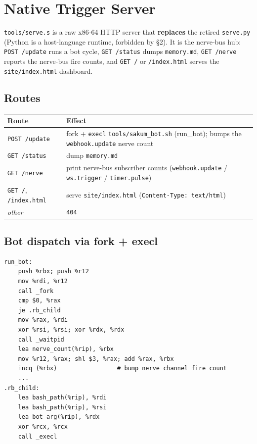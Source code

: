 \section{Native Trigger Server}\label{ch:server}

\texttt{tools/serve.s} is a raw x86-64 HTTP server that \textbf{replaces}
the retired \texttt{serve.py} (Python is a host-language runtime, forbidden
by \S2).  It is the nerve-bus hub: \texttt{POST /update} runs a bot cycle,
\texttt{GET /status} dumps \texttt{memory.md}, \texttt{GET /nerve} reports
the nerve-bus fire counts, and \texttt{GET /} or \texttt{/index.html}
serves the \texttt{site/index.html} dashboard.

\subsection{Routes}

\begin{table}[H]
\centering
\begin{tabularx}{\textwidth}{lX}
\toprule
Route & Effect \\
\midrule
\texttt{POST /update} & fork + \texttt{execl} \texttt{tools/sakum\_bot.sh}
  (run\_bot); bumps the \texttt{webhook.update} nerve count \\
\texttt{GET /status} & dump \texttt{memory.md} \\
\texttt{GET /nerve} & print nerve-bus subscriber counts
  (\texttt{webhook.update} / \texttt{ws.trigger} / \texttt{timer.pulse}) \\
\texttt{GET /}, \texttt{/index.html} & serve \texttt{site/index.html}
  (\texttt{Content-Type: text/html}) \\
\textit{other} & \texttt{404} \\
\bottomrule
\end{tabularx}
\end{table}

\subsection{Bot dispatch via fork + execl}

\begin{lstlisting}[language=SakumAsm,caption={run\_bot forks a detached child (serve.s:157).}]
run_bot:
    push %rbx; push %r12
    mov %rdi, %r12
    call _fork
    cmp $0, %rax
    je .rb_child
    mov %rax, %rdi
    xor %rsi, %rsi; xor %rdx, %rdx
    call _waitpid
    lea nerve_count(%rip), %rbx
    mov %r12, %rax; shl $3, %rax; add %rax, %rbx
    incq (%rbx)                 # bump nerve channel fire count
    ...
.rb_child:
    lea bash_path(%rip), %rdi
    lea bash_path(%rip), %rsi
    lea bot_arg(%rip), %rdx
    xor %rcx, %rcx
    call _execl
\end{lstlisting}


